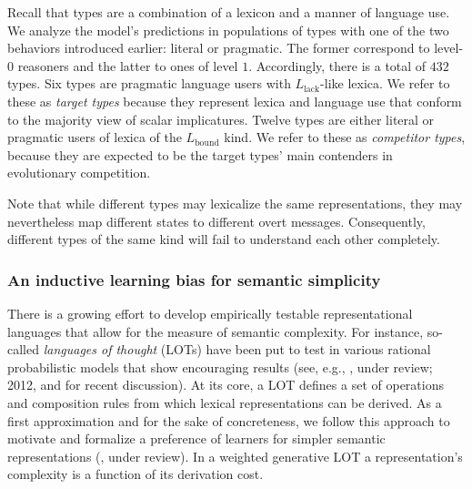 \documentclass[a4paper, 11pt]{article}
\theoremstyle{Satz}
\newcommand{\mylang}[1]{\ensuremath{L_{\text{#1}}}\xspace} %
\newcommand{\Lall}{\mylang{all}}
\newcommand{\Lbound}{\mylang{bound}}
\newcommand{\Llack}{\mylang{lack}}
\begin{document}

Recall that types are a combination of a lexicon and a manner of language use. We analyze the
model's predictions in populations of types with one of the two behaviors introduced earlier:
literal or pragmatic. The former correspond to level-$0$ reasoners and the latter to ones of level $1$. Accordingly, there is a total of $432$ types. Six types are pragmatic language
users with $\Llack$-like lexica. We refer to these as \emph{target types} because they
represent lexica and language use that conform to the majority view of scalar
implicatures. Twelve types are either literal or pragmatic users of lexica of the
$\Lbound$ kind. We refer to these as \emph{competitor types}, because they are expected to be
the target types' main contenders in evolutionary competition. 

Note that while different types may lexicalize the same representations, they may nevertheless
map different states to different overt messages. Consequently, different types of the same
kind will fail to understand each other completely.




\subsubsection{An inductive learning bias for semantic simplicity}
\label{sec:an-induct-learn}

There is a growing effort to develop empirically testable representational languages that allow
for the measure of semantic complexity. For instance, so-called {\em languages of thought}
(LOTs) have been put to test in various rational probabilistic models that show encouraging
results (see, e.g., \citealt{katz+etal:2008}, \citeauthor{piantadosi+etal:underreview} under review; 2012, and \citealt{piantadosi+jacobs:2016} for recent discussion). At its
core, a LOT defines a set of operations and composition rules from which lexical representations can be
derived. As a first approximation and for the sake of concreteness, we follow this approach to
motivate and formalize a preference of learners for simpler semantic representations
(\citealt{feldman:2000, chater+vitanyi:2003, piantadosi+etal:2012a,kirby+etal:2015}, \citeauthor{piantadosi+etal:underreview} under review). 
In a weighted generative LOT a representation's complexity is a function of its derivation cost.
\end{document}
